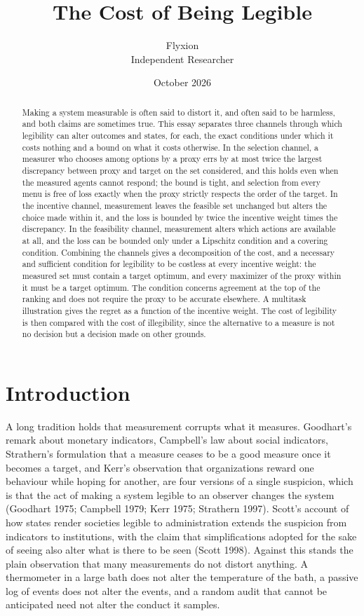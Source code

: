 \documentclass[11pt]{article}
\title{The Cost of Being Legible}
\author{Flyxion\\Independent Researcher}
\date{October 2026}
\theoremstyle{remark}
\begin{document}
\maketitle

\begin{abstract}
Making a system measurable is often said to distort it, and often said to be harmless, and both claims are sometimes true. This essay separates three channels through which legibility can alter outcomes and states, for each, the exact conditions under which it costs nothing and a bound on what it costs otherwise. In the selection channel, a measurer who chooses among options by a proxy errs by at most twice the largest discrepancy between proxy and target on the set considered, and this holds even when the measured agents cannot respond; the bound is tight, and selection from every menu is free of loss exactly when the proxy strictly respects the order of the target. In the incentive channel, measurement leaves the feasible set unchanged but alters the choice made within it, and the loss is bounded by twice the incentive weight times the discrepancy. In the feasibility channel, measurement alters which actions are available at all, and the loss can be bounded only under a Lipschitz condition and a covering condition. Combining the channels gives a decomposition of the cost, and a necessary and sufficient condition for legibility to be costless at every incentive weight: the measured set must contain a target optimum, and every maximizer of the proxy within it must be a target optimum. The condition concerns agreement at the top of the ranking and does not require the proxy to be accurate elsewhere. A multitask illustration gives the regret as a function of the incentive weight. The cost of legibility is then compared with the cost of illegibility, since the alternative to a measure is not no decision but a decision made on other grounds.
\end{abstract}

\section{Introduction}

A long tradition holds that measurement corrupts what it measures. Goodhart's remark about monetary indicators, Campbell's law about social indicators, Strathern's formulation that a measure ceases to be a good measure once it becomes a target, and Kerr's observation that organizations reward one behaviour while hoping for another, are four versions of a single suspicion, which is that the act of making a system legible to an observer changes the system (Goodhart 1975; Campbell 1979; Kerr 1975; Strathern 1997). Scott's account of how states render societies legible to administration extends the suspicion from indicators to institutions, with the claim that simplifications adopted for the sake of seeing also alter what is there to be seen (Scott 1998). Against this stands the plain observation that many measurements do not distort anything. A thermometer in a large bath does not alter the temperature of the bath, a passive log of events does not alter the events, and a random audit that cannot be anticipated need not alter the conduct it samples.
\end{document}
